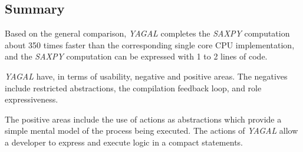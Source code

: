 \subsection{Summary} \label{sec:yagalEvalSum}
Based on the general comparison, \textit{YAGAL} completes the \textit{SAXPY} computation about 350 times faster than the corresponding single core CPU implementation, and the \textit{SAXPY} computation can be expressed with 1 to 2 lines of code. 

\textit{YAGAL} have, in terms of usability, negative and positive areas. The negatives include restricted abstractions, the compilation feedback loop, and role expressiveness.

The positive areas include the use of actions as abstractions which provide a simple mental model of the process being executed. The actions of \textit{YAGAL} allow a developer to express and execute  logic in a compact statements.
